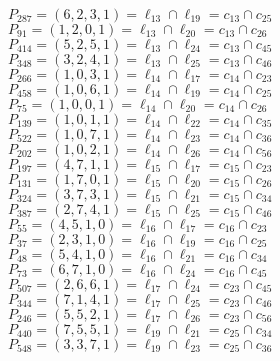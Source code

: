 \documentclass{article}
\begin{document}
{\begin{multicols}{2}
$P_{287} = ( 6, 2, 3, 1 ) = \ell_{13} \cap \ell_{19}  = c_{13} \cap c_{25}$\\
$P_{91} = ( 1, 2, 0, 1 ) = \ell_{13} \cap \ell_{20}  = c_{13} \cap c_{26}$\\
$P_{414} = ( 5, 2, 5, 1 ) = \ell_{13} \cap \ell_{24}  = c_{13} \cap c_{45}$\\
$P_{348} = ( 3, 2, 4, 1 ) = \ell_{13} \cap \ell_{25}  = c_{13} \cap c_{46}$\\
$P_{266} = ( 1, 0, 3, 1 ) = \ell_{14} \cap \ell_{17}  = c_{14} \cap c_{23}$\\
$P_{458} = ( 1, 0, 6, 1 ) = \ell_{14} \cap \ell_{19}  = c_{14} \cap c_{25}$\\
$P_{75} = ( 1, 0, 0, 1 ) = \ell_{14} \cap \ell_{20}  = c_{14} \cap c_{26}$\\
$P_{139} = ( 1, 0, 1, 1 ) = \ell_{14} \cap \ell_{22}  = c_{14} \cap c_{35}$\\
$P_{522} = ( 1, 0, 7, 1 ) = \ell_{14} \cap \ell_{23}  = c_{14} \cap c_{36}$\\
$P_{202} = ( 1, 0, 2, 1 ) = \ell_{14} \cap \ell_{26}  = c_{14} \cap c_{56}$\\
$P_{197} = ( 4, 7, 1, 1 ) = \ell_{15} \cap \ell_{17}  = c_{15} \cap c_{23}$\\
$P_{131} = ( 1, 7, 0, 1 ) = \ell_{15} \cap \ell_{20}  = c_{15} \cap c_{26}$\\
$P_{324} = ( 3, 7, 3, 1 ) = \ell_{15} \cap \ell_{21}  = c_{15} \cap c_{34}$\\
$P_{387} = ( 2, 7, 4, 1 ) = \ell_{15} \cap \ell_{25}  = c_{15} \cap c_{46}$\\
$P_{55} = ( 4, 5, 1, 0 ) = \ell_{16} \cap \ell_{17}  = c_{16} \cap c_{23}$\\
$P_{37} = ( 2, 3, 1, 0 ) = \ell_{16} \cap \ell_{19}  = c_{16} \cap c_{25}$\\
$P_{48} = ( 5, 4, 1, 0 ) = \ell_{16} \cap \ell_{21}  = c_{16} \cap c_{34}$\\
$P_{73} = ( 6, 7, 1, 0 ) = \ell_{16} \cap \ell_{24}  = c_{16} \cap c_{45}$\\
$P_{507} = ( 2, 6, 6, 1 ) = \ell_{17} \cap \ell_{24}  = c_{23} \cap c_{45}$\\
$P_{344} = ( 7, 1, 4, 1 ) = \ell_{17} \cap \ell_{25}  = c_{23} \cap c_{46}$\\
$P_{246} = ( 5, 5, 2, 1 ) = \ell_{17} \cap \ell_{26}  = c_{23} \cap c_{56}$\\
$P_{440} = ( 7, 5, 5, 1 ) = \ell_{19} \cap \ell_{21}  = c_{25} \cap c_{34}$\\
$P_{548} = ( 3, 3, 7, 1 ) = \ell_{19} \cap \ell_{23}  = c_{25} \cap c_{36}$\\

\end{multicols}}
\end{document}
